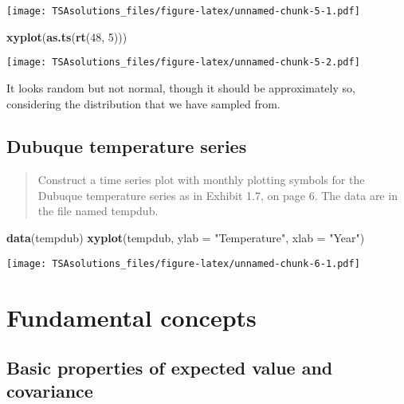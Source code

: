 \documentclass[]{book}
\newenvironment{Shaded}{\begin{snugshade}}{\end{snugshade}}
\newcommand{\KeywordTok}[1]{\textcolor[rgb]{0.13,0.29,0.53}{\textbf{{#1}}}}
\newcommand{\DataTypeTok}[1]{\textcolor[rgb]{0.13,0.29,0.53}{{#1}}}
\newcommand{\DecValTok}[1]{\textcolor[rgb]{0.00,0.00,0.81}{{#1}}}
\newcommand{\StringTok}[1]{\textcolor[rgb]{0.31,0.60,0.02}{{#1}}}
\newcommand{\NormalTok}[1]{{#1}}
\begin{document}
\texttt{[image: TSAsolutions\_files/figure-latex/unnamed-chunk-5-1.pdf]}

\begin{Shaded}
\begin{Highlighting}[]
\KeywordTok{xyplot}\NormalTok{(}\KeywordTok{as.ts}\NormalTok{(}\KeywordTok{rt}\NormalTok{(}\DecValTok{48}\NormalTok{, }\DecValTok{5}\NormalTok{)))}
\end{Highlighting}
\end{Shaded}

\texttt{[image: TSAsolutions\_files/figure-latex/unnamed-chunk-5-2.pdf]}

It looks random but not normal, though it should be approximately so,
considering the distribution that we have sampled from.

\section{Dubuque temperature series}\label{dubuque-temperature-series}

\begin{quote}
Construct a time series plot with monthly plotting symbols for the
Dubuque temperature series as in Exhibit 1.7, on page 6. The data are in
the file named tempdub.
\end{quote}

\begin{Shaded}
\begin{Highlighting}[]
\KeywordTok{data}\NormalTok{(tempdub)}
\KeywordTok{xyplot}\NormalTok{(tempdub, }\DataTypeTok{ylab =} \StringTok{"Temperature"}\NormalTok{, }\DataTypeTok{xlab =} \StringTok{"Year"}\NormalTok{)}
\end{Highlighting}
\end{Shaded}

\texttt{[image: TSAsolutions\_files/figure-latex/unnamed-chunk-6-1.pdf]}

\chapter{Fundamental concepts}\label{fundamental-concepts}

\section{Basic properties of expected value and
covariance}\label{basic-properties-of-expected-value-and-covariance}
\end{document}
